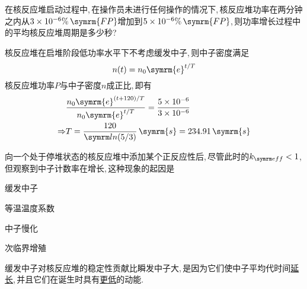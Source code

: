 \begin{exercise}
    在核反应堆启动过程中,\,在操作员未进行任何操作的情况下,\,核反应堆功率在两分钟之内从$3\times 10^{-6}\%\,\symrm{FP}$增加到$5\times 10^{-6}\%\,\symrm{FP}$,\,则功率增长过程中的平均核反应堆周期是多少秒?
    \begin{solution}
        核反应堆在启堆阶段低功率水平下不考虑缓发中子,\,则中子密度满足
        \begin{equation*}
            n(t) = n_0 \symrm{e}^{t/T}
        \end{equation*}
        核反应堆功率$P$与中子密度$n$成正比,\,即有
        \begin{align*}
                        &\frac{n_0 \symrm{e}^{(t+120)/T}}{n_0 \symrm{e}^{t/T}} = \frac{5\times 10^{-6}}{3\times 10^{-6}} \\
            \Rightarrow & T = \frac{120}{\loge (5/3)}\,\symrm{s} = 234.91\,\symrm{s}
        \end{align*}
    \end{solution}
\end{exercise}

\begin{exercise}
    向一个处于停堆状态的核反应堆中添加某个正反应性后,\,尽管此时的$\keff < 1$,\,但观察到中子计数率在增长,\,这种现象的起因是\xparen
    \begin{xchoices}[showanswer=true]
        \item 缓发中子
        \item 等温温度系数
        \item 中子慢化
        \item* 次临界增殖
    \end{xchoices}
\end{exercise}

\begin{exercise}
    缓发中子对核反应堆的稳定性贡献比瞬发中子大,\,是因为它们使中子平均代时间\underline{延长},\,并且它们在诞生时具有\underline{更低}的动能.\,
\end{exercise}

